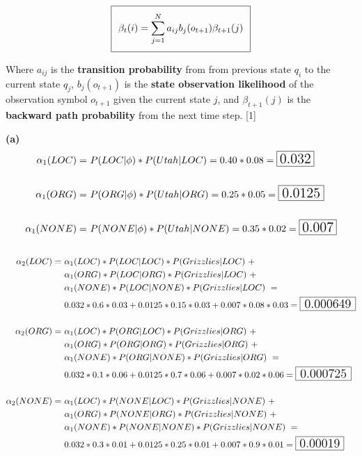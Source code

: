 \documentclass[11pt]{article}
\renewcommand\part[1]{\vspace{.10in}\textbf{(#1)}}
\begin{document}
\begin{equation}
\setlength\fboxsep{0.25cm}
\setlength\fboxrule{0.4pt}
\boxed{\beta_t(i) = \sum_{j = 1}^N a_{ij}b_j(o_{t+1})\beta_{t+1}(j)}
\end{equation}

Where $a_{ij}$ is the \textbf{transition probability} from from previous state $q_i$ to the current state $q_j$, $b_j(o_{t+1})$ is the \textbf{state observation likelihood} of the observation symbol $o_{t+1}$ given the current state $j$, and $\beta_{t+1}(j)$ is the \textbf{backward path probability} from the next time step. [1]

\part{a} 
\begin{align*}
\alpha_1(LOC) = &\ P(LOC | \phi) * P(Utah | LOC) = 0.40 * 0.08 = \framebox[1.2\width]{\Large{0.032}} \\ \\
\alpha_1(ORG) = &\ P(ORG | \phi) * P(Utah | ORG) = 0.25 * 0.05 = \framebox[1.2\width]{\Large{0.0125}} \\ \\
\alpha_1(NONE) = &\ P(NONE | \phi) * P(Utah | NONE) = 0.35 * 0.02 = \framebox[1.2\width]{\Large{0.007}} \\ \\
\end{align*}
\begin{align*}
\alpha_2(LOC) = &\ \alpha_1(LOC) * P(LOC | LOC) * P(Grizzlies | LOC) \  + \\
&\ \alpha_1(ORG) * P(LOC | ORG) * P(Grizzlies | LOC) \ + \\
&\ \alpha_1(NONE) * P(LOC | NONE) * P(Grizzlies | LOC) \ = \\
&\ 0.032 * 0.6 * 0.03 + 0.0125 * 0.15 * 0.03 + 0.007 * 0.08 * 0.03 = \framebox[1.2\width]{\Large{0.000649}} \\ \\
\alpha_2(ORG) = &\ \alpha_1(LOC) * P(ORG | LOC) * P(Grizzlies | ORG) \  + \\
&\ \alpha_1(ORG) * P(ORG | ORG) * P(Grizzlies | ORG) \ + \\
&\ \alpha_1(NONE) * P(ORG | NONE) * P(Grizzlies | ORG) \ = \\
&\  0.032 * 0.1 * 0.06 + 0.0125 * 0.7 * 0.06 + 0.007 * 0.02 * 0.06 = \framebox[1.2\width]{\Large{0.000725}} \\ \\
\alpha_2(NONE) = &\ \alpha_1(LOC) * P(NONE | LOC) * P(Grizzlies | NONE) \  + \\
&\ \alpha_1(ORG) * P(NONE | ORG) * P(Grizzlies | NONE) \ + \\
&\ \alpha_1(NONE) * P(NONE | NONE) * P(Grizzlies | NONE) \ = \\
&\  0.032 * 0.3 * 0.01 + 0.0125 * 0.25 * 0.01 + 0.007 * 0.9 * 0.01 = \framebox[1.2\width]{\Large{0.00019}} \\
\end{align*}
\end{document}
